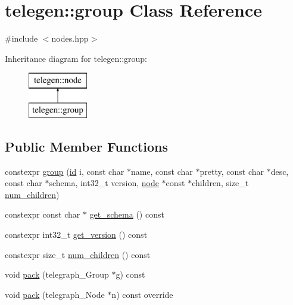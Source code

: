 \hypertarget{classtelegen_1_1group}{}\section{telegen\+:\+:group Class Reference}
\label{classtelegen_1_1group}


{\ttfamily \#include $<$nodes.\+hpp$>$}

Inheritance diagram for telegen\+:\+:group\+:\begin{figure}[H]
\begin{center}
\leavevmode
\includegraphics[height=2.000000cm]{classtelegen_1_1group}
\end{center}
\end{figure}
\subsection*{Public Member Functions}
\begin{DoxyCompactItemize}
\item 
constexpr \hyperlink{classtelegen_1_1group_aed66803b4b989a001bdafcd501d074ba}{group} (\hyperlink{classtelegen_1_1node_aae3ff0d12932c55fdc88a1743e27ea56}{id} i, const char $\ast$name, const char $\ast$pretty, const char $\ast$desc, const char $\ast$schema, int32\+\_\+t version, \hyperlink{classtelegen_1_1node}{node} $\ast$const $\ast$children, size\+\_\+t \hyperlink{classtelegen_1_1group_a499258baf8b0eb11ef802202d4385734}{num\+\_\+children})
\item 
constexpr const char $\ast$ \hyperlink{classtelegen_1_1group_ad5e61c5d1787e20921691b0ec2351396}{get\+\_\+schema} () const
\item 
constexpr int32\+\_\+t \hyperlink{classtelegen_1_1group_ad4652953e0a87d7569e4ec3ded5c2286}{get\+\_\+version} () const
\item 
constexpr size\+\_\+t \hyperlink{classtelegen_1_1group_a499258baf8b0eb11ef802202d4385734}{num\+\_\+children} () const
\item 
void \hyperlink{classtelegen_1_1group_a40efc73239b71ebaa59fe2e95f3e96a7}{pack} (telegraph\+\_\+\+Group $\ast$g) const
\item 
void \hyperlink{classtelegen_1_1group_ae146155bf745b0b3d39e3244c3ebb26d}{pack} (telegraph\+\_\+\+Node $\ast$n) const override
\end{DoxyCompactItemize}
